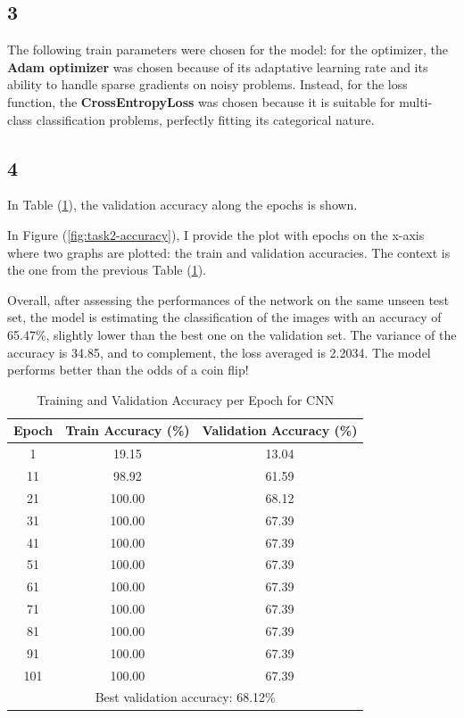 \documentclass[11pt]{scrartcl}
\begin{document}
\subsection*{3}

The following train parameters were chosen for the model:
for the optimizer, the \textbf{Adam optimizer} was chosen 
because of its adaptative learning rate
and its ability to handle sparse gradients on noisy problems.
Instead, for the loss function, the \textbf{CrossEntropyLoss} was chosen 
because it is suitable for multi-class classification problems,
perfectly fitting its categorical nature.


\subsection*{4}

In Table (\ref{tab:task2-accuracy}),
the validation accuracy along the epochs is shown.

In Figure (\ref{fig:task2-accuracy}), 
I provide the plot with epochs on the x-axis where two graphs are plotted:
the train and validation accuracies.
The context is the one from the previous Table (\ref{tab:task2-accuracy}). 

Overall, after assessing the performances of the network on the same unseen test set,
the model is estimating the classification of the images with an accuracy of 65.47\%, 
slightly lower than the best one on the validation set.
The variance of the accuracy is 34.85, and to complement, the loss averaged is 2.2034.
The model performs better than the odds of a coin flip!

\begin{table}[htbp]
\centering
\caption{Training and Validation Accuracy per Epoch for CNN}
\begin{tabular}{ccc}
\toprule
\textbf{Epoch} & \textbf{Train Accuracy (\%)} & \textbf{Validation Accuracy (\%)} \\
\midrule
1    & 19.15  & 13.04  \\
11   & 98.92  & 61.59  \\
21   & 100.00 & 68.12  \\
31   & 100.00 & 67.39  \\
41   & 100.00 & 67.39  \\
51   & 100.00 & 67.39  \\
61   & 100.00 & 67.39  \\
71   & 100.00 & 67.39  \\
81   & 100.00 & 67.39  \\
91   & 100.00 & 67.39  \\
101  & 100.00 & 67.39  \\
\midrule
\multicolumn{3}{c}{Best validation accuracy: 68.12\%} \\
\bottomrule
\end{tabular}
\label{tab:task2-accuracy}
\end{table}
\end{document}
